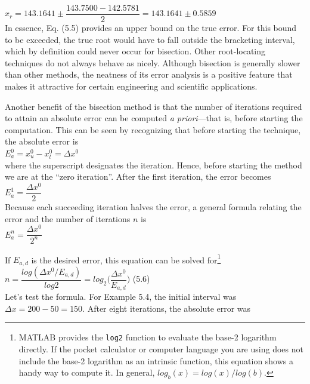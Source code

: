 \documentclass[../main.tex]{subfiles}
\begin{document}
$x_r = 143.1641\pm\dfrac{143.7500-142.5781}{2}=143.1641\pm 0.5859$\\

In essence, Eq. (5.5) provides an upper bound on the true error. For this bound to be
exceeded, the true root would have to fall outside the bracketing interval, which by definition
could never occur for bisection. Other root-locating techniques do not always behave
as nicely. Although bisection is generally slower than other methods, the neatness of its
error analysis is a positive feature that makes it attractive for certain engineering and
scientific applications.

Another benefit of the bisection method is that the number of iterations required to attain
an absolute error can be computed \emph{a priori}---that is, before starting the computation.
This can be seen by recognizing that before starting the technique, the absolute error is\\

$E^0_a = x^0_u-x^0_l = \Delta x^0$\\

\noindent where the superscript designates the iteration. Hence, before starting the method we are at
the ``zero iteration''. After the first iteration, the error becomes\\

$E^1_a = \dfrac{\Delta x^0}{2}$\\

\noindent Because each succeeding iteration halves the error, a general formula relating the error and
the number of iterations $n$ is\\

$E^n_a = \dfrac{\Delta x^0}{2^n}$\\
\newpage

\noindent If $E_{a,d}$ is the desired error, this equation can be solved for\footnote{MATLAB provides the \texttt{log2} function to evaluate the base-2 logarithm directly. If the pocket calculator or
computer language you are using does not include the base-2 logarithm as an intrinsic function, this equation
shows a handy way to compute it. In general, $log_b(x) = log(x)/log(b)$.}\\

$n = \dfrac{log(\Delta x^0/E_{a,d})}{log2}=log_2\Big(\dfrac{\Delta x^0}{E_{a,d}}\Big)$
\hfill (5.6)\\

Let's test the formula. For Example 5.4, the initial interval was $\Delta x = 200-50 = 150$.
After eight iterations, the absolute error was\\
\end{document}
